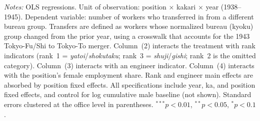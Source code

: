 \begin{table}[htbp]
\begin{threeparttable}
\begin{tabular}{lcccc}
\end{tabular}
\begin{tablenotes}[flushleft]
\footnotesize
\item \textit{Notes:} OLS regressions. Unit of observation: position $\times$ kakari $\times$ year (1938--1945). Dependent variable: number of workers who transferred in from a different bureau group. Transfers are defined as workers whose normalized bureau (kyoku) group changed from the prior year, using a crosswalk that accounts for the 1943 Tokyo-Fu/Shi to Tokyo-To merger. Column~(2) interacts the treatment with rank indicators (rank~1 = \emph{yatoi}/\emph{shokutaku}; rank~3 = \emph{shuji}/\emph{gishi}; rank~2 is the omitted category). Column~(3) interacts with an engineer indicator. Column~(4) interacts with the position's female employment share. Rank and engineer main effects are absorbed by position fixed effects. All specifications include year, ka, and position fixed effects, and control for log cumulative male baseline (not shown). Standard errors clustered at the office level in parentheses. $^{***}p<0.01$, $^{**}p<0.05$, $^{*}p<0.1$.
\end{tablenotes}
\end{threeparttable}
\end{table}
